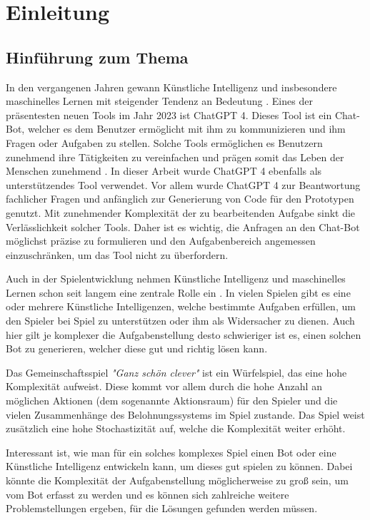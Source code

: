 \section{Einleitung}
\subsection{Hinführung zum Thema}
In den vergangenen Jahren gewann Künstliche Intelligenz und insbesondere maschinelles Lernen mit steigender Tendenz an Bedeutung \cite{statista_aiworldwide}. Eines der präsentesten neuen Tools im Jahr 2023 ist ChatGPT 4. Dieses Tool ist ein Chat-Bot, welcher es dem Benutzer ermöglicht mit ihm zu kommunizieren und ihm Fragen oder Aufgaben zu stellen. Solche Tools ermöglichen es Benutzern zunehmend ihre Tätigkeiten zu vereinfachen und prägen somit das Leben der Menschen zunehmend \cite{tagesschaude_chatgpt_nodate}. In dieser Arbeit wurde ChatGPT 4 ebenfalls als unterstützendes Tool verwendet. Vor allem wurde ChatGPT 4 zur Beantwortung fachlicher Fragen und anfänglich zur Generierung von Code für den Prototypen genutzt. Mit zunehmender Komplexität der zu bearbeitenden Aufgabe sinkt die Verlässlichkeit solcher Tools. Daher ist es wichtig, die Anfragen an den Chat-Bot möglichst präzise zu formulieren und den Aufgabenbereich angemessen einzuschränken, um das Tool nicht zu überfordern.

Auch in der Spielentwicklung nehmen Künstliche Intelligenz und maschinelles Lernen schon seit langem eine zentrale Rolle ein \cite{noauthor_kunstliche_2023,millington_ai_2019}. In vielen Spielen gibt es eine oder mehrere Künstliche Intelligenzen, welche bestimmte Aufgaben erfüllen, um den Spieler bei Spiel zu unterstützen oder ihm als Widersacher zu dienen. Auch hier gilt je komplexer die Aufgabenstellung desto schwieriger ist es, einen solchen Bot zu generieren, welcher diese gut und richtig lösen kann.

Das Gemeinschaftsspiel \textit{"Ganz schön clever"} ist ein Würfelspiel, das eine hohe Komplexität aufweist. Diese kommt vor allem durch die hohe Anzahl an möglichen Aktionen (dem sogenannte Aktionsraum) für den Spieler und die vielen Zusammenhänge des Belohnungssystems im Spiel zustande. Das Spiel weist zusätzlich eine hohe Stochastizität auf, welche die Komplexität weiter erhöht.

Interessant ist, wie man für ein solches komplexes Spiel einen Bot oder eine Künstliche Intelligenz entwickeln kann, um dieses gut spielen zu können. Dabei könnte die Komplexität der Aufgabenstellung möglicherweise zu groß sein, um vom Bot erfasst zu werden und es können sich zahlreiche weitere Problemstellungen ergeben, für die Lösungen gefunden werden müssen.
